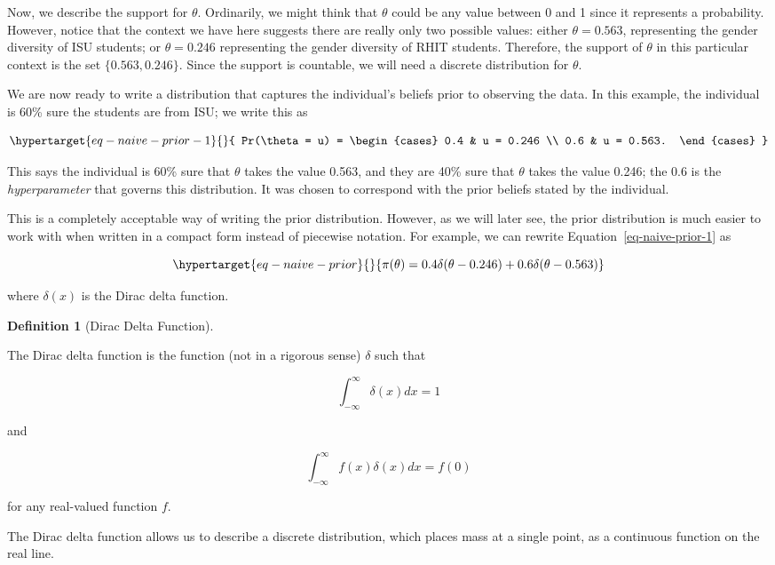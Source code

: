 \documentclass[
  letterpaper,
  DIV=11,
  numbers=noendperiod]{scrreprt}
\theoremstyle{definition}
\theoremstyle{definition}
\newtheorem{definition}{Definition}[chapter]
\theoremstyle{plain}
\theoremstyle{remark}
\begin{document}
Now, we describe the support for \(\theta\). Ordinarily, we might think
that \(\theta\) could be any value between 0 and 1 since it represents a
probability. However, notice that the context we have here suggests
there are really only two possible values: either \(\theta = 0.563\),
representing the gender diversity of ISU students; or \(\theta = 0.246\)
representing the gender diversity of RHIT students. Therefore, the
support of \(\theta\) in this particular context is the set
\(\{0.563, 0.246\}\). Since the support is countable, we will need a
discrete distribution for \(\theta\).

We are now ready to write a distribution that captures the individual's
beliefs prior to observing the data. In this example, the individual is
60\% sure the students are from ISU; we write this as

\begin{equation}\protect\hypertarget{eq-naive-prior-1}{}{
Pr(\theta = u) = \begin{cases}
  0.4 & u = 0.246 \\
  0.6 & u = 0.563. \end{cases}
}\label{eq-naive-prior-1}\end{equation}

This says the individual is 60\% sure that \(\theta\) takes the value
0.563, and they are 40\% sure that \(\theta\) takes the value 0.246; the
0.6 is the \emph{hyperparameter} that governs this distribution. It was
chosen to correspond with the prior beliefs stated by the individual.

This is a completely acceptable way of writing the prior distribution.
However, as we will later see, the prior distribution is much easier to
work with when written in a compact form instead of piecewise notation.
For example, we can rewrite Equation~\ref{eq-naive-prior-1} as

\begin{equation}\protect\hypertarget{eq-naive-prior}{}{\pi(\theta) = 0.4\delta(\theta - 0.246) + 0.6\delta(\theta - 0.563)}\label{eq-naive-prior}\end{equation}

where \(\delta(x)\) is the Dirac delta function.

\begin{definition}[Dirac Delta
Function]\protect\hypertarget{def-dirac-delta}{}\label{def-dirac-delta}

The Dirac delta function is the function (not in a rigorous sense)
\(\delta\) such that

\[\int_{-\infty}^{\infty} \delta(x) dx = 1\]

and

\[\int_{-\infty}^{\infty} f(x) \delta(x) dx = f(0)\]

for any real-valued function \(f\).

The Dirac delta function allows us to describe a discrete distribution,
which places mass at a single point, as a continuous function on the
real line.

\end{definition}
\end{document}
